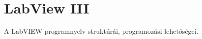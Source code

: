 \documentclass[../../main.tex]{subfiles}
\begin{document}
\section{LabView III}

\begin{fulltheorem}
	A LabVIEW programnyelv struktúrái, programozási lehetőségei.
\end{fulltheorem}
\end{document}
